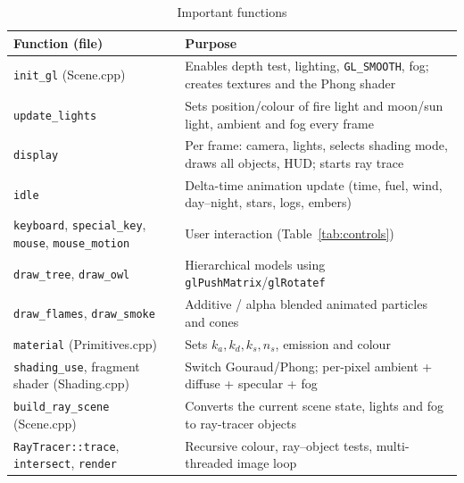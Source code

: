\documentclass[12pt,a4paper]{report}
\newcommand{\tabfmt}{\footnotesize\singlespacing\renewcommand{\arraystretch}{1.1}}
\begin{document}
\begin{table}[!htbp]
\centering\tabfmt
\caption{Important functions}
\label{tab:funcs}
\begin{tabularx}{\textwidth}{|l|Y|}
\hline
\textbf{Function (file)} & \textbf{Purpose} \\
\hline
\texttt{init\_gl} (Scene.cpp) & Enables depth test, lighting, \texttt{GL\_SMOOTH}, fog; creates textures and the Phong shader \\
\hline
\texttt{update\_lights} & Sets position/colour of fire light and moon/sun light, ambient and fog every frame \\
\hline
\texttt{display} & Per frame: camera, lights, selects shading mode, draws all objects, HUD; starts ray trace \\
\hline
\texttt{idle} & Delta-time animation update (time, fuel, wind, day--night, stars, logs, embers) \\
\hline
\texttt{keyboard}, \texttt{special\_key}, \texttt{mouse}, \texttt{mouse\_motion} & User interaction (Table~\ref{tab:controls}) \\
\hline
\texttt{draw\_tree}, \texttt{draw\_owl} & Hierarchical models using \texttt{glPushMatrix}/\texttt{glRotatef} \\
\hline
\texttt{draw\_flames}, \texttt{draw\_smoke} & Additive / alpha blended animated particles and cones \\
\hline
\texttt{material} (Primitives.cpp) & Sets $k_a,k_d,k_s,n_s$, emission and colour \\
\hline
\texttt{shading\_use}, fragment shader (Shading.cpp) & Switch Gouraud/Phong; per-pixel ambient + diffuse + specular + fog \\
\hline
\texttt{build\_ray\_scene} (Scene.cpp) & Converts the current scene state, lights and fog to ray-tracer objects \\
\hline
\texttt{RayTracer::trace}, \texttt{intersect}, \texttt{render} & Recursive colour, ray--object tests, multi-threaded image loop \\
\hline
\end{tabularx}
\end{table}
\end{document}
